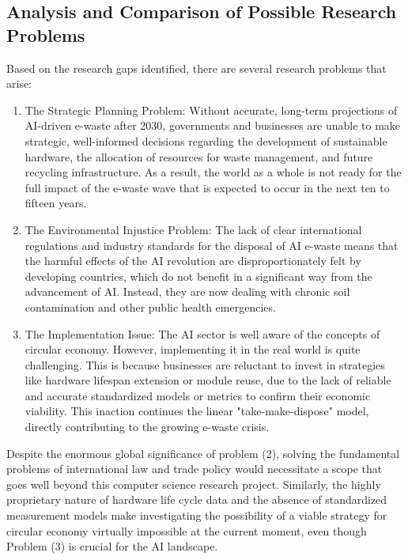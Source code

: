 \documentclass[a4paper, 12pt]{article}
\begin{document}
\subsection*{Analysis and Comparison of Possible Research Problems}
Based on the research gaps identified, there are several research problems that arise: 

\begin{enumerate}
    \item The Strategic Planning Problem: Without accurate, long-term projections of AI-driven e-waste after 2030, governments and businesses are unable to make strategic, well-informed decisions regarding the development of sustainable hardware, the allocation of resources for waste management, and future recycling infrastructure. As a result, the world as a whole is not ready for the full impact of the e-waste wave that is expected to occur in the next ten to fifteen years.
 
	\item The Environmental Injustice Problem: The lack of clear international regulations and industry standards for the disposal of AI e-waste means that the harmful effects of the AI revolution are disproportionately felt by developing countries, which do not benefit in a significant way from the advancement of AI. Instead, they are now dealing with chronic soil contamination and other public health emergencies.
	
    \item The Implementation Issue: The AI sector is well aware of the concepts of circular economy. However, implementing it in the real world is quite challenging. This is because businesses are reluctant to invest in strategies like hardware lifespan extension or module reuse, due to the lack of reliable and accurate standardized models or metrics to confirm their economic viability. This inaction continues the linear "take-make-dispose" model, directly contributing to the growing e-waste crisis.
\end{enumerate}

Despite the enormous global significance of problem (2), solving the fundamental problems of international law and trade policy would necessitate a scope that goes well beyond this computer science research project.  Similarly, the highly proprietary nature of hardware life cycle data and the absence of standardized measurement models make investigating the possibility of a viable strategy for circular economy virtually impossible at the current moment, even though Problem (3) is crucial for the AI landscape.
\end{document}
